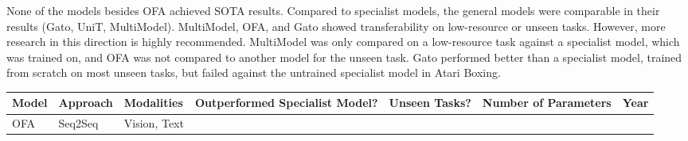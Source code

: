 \documentclass[
]{krantz}
\begin{document}
None of the models besides OFA achieved SOTA results. Compared to specialist models, the general models were comparable in their results (Gato, UniT, MultiModel). MultiModel, OFA, and Gato showed transferability on
low-resource or unseen tasks. However, more research in this direction is highly recommended. MultiModel was only compared on a low-resource task against a specialist model, which was trained on,
and OFA was not compared to another model for the unseen task. Gato performed better than a specialist model, trained from scratch on most unseen tasks, but failed against the untrained specialist
model in Atari Boxing.

\begin{longtable}[]{@{}lllllll@{}}
\toprule
\begin{minipage}[b]{0.12\columnwidth}\raggedright
Model\strut
\end{minipage} & \begin{minipage}[b]{0.12\columnwidth}\raggedright
Approach\strut
\end{minipage} & \begin{minipage}[b]{0.12\columnwidth}\raggedright
Modalities\strut
\end{minipage} & \begin{minipage}[b]{0.12\columnwidth}\raggedright
Outperformed Specialist Model?\strut
\end{minipage} & \begin{minipage}[b]{0.12\columnwidth}\raggedright
Unseen Tasks?\strut
\end{minipage} & \begin{minipage}[b]{0.12\columnwidth}\raggedright
Number of Parameters\strut
\end{minipage} & \begin{minipage}[b]{0.12\columnwidth}\raggedright
Year\strut
\end{minipage}\tabularnewline
\midrule
\endhead
\begin{minipage}[t]{0.12\columnwidth}\raggedright
OFA\strut
\end{minipage} & \begin{minipage}[t]{0.12\columnwidth}\raggedright
Seq2Seq\strut
\end{minipage} & \begin{minipage}[t]{0.12\columnwidth}\raggedright
Vision, Text\strut
\end{minipage} & \begin{minipage}[t]{0.12\columnwidth}\raggedright
\strut
\end{minipage} & \begin{minipage}[t]{0.12\columnwidth}\raggedright

\end{minipage}
\end{longtable}
\end{document}
